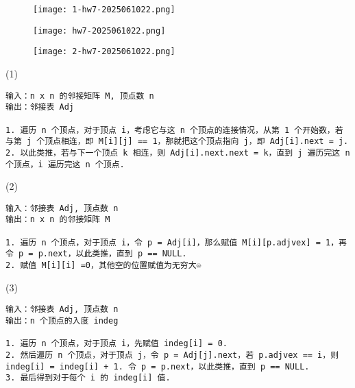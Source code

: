 \begin{exercise}
\begin{figure}[H]
\centering
\texttt{[image: 1-hw7-2025061022.png]}
\label{}
\end{figure}
\end{exercise}
\begin{figure}[H]
\centering
\texttt{[image: hw7-2025061022.png]}
\label{}
\end{figure}

\begin{exercise}
\begin{figure}[H]
\centering
\texttt{[image: 2-hw7-2025061022.png]}
\label{}
\end{figure}
\end{exercise}
(1)

\begin{lstlisting}
输入：n x n 的邻接矩阵 M, 顶点数 n
输出：邻接表 Adj

1. 遍历 n 个顶点，对于顶点 i，考虑它与这 n 个顶点的连接情况，从第 1 个开始数，若与第 j 个顶点相连，即 M[i][j] == 1，那就把这个顶点指向 j，即 Adj[i].next = j.
2. 以此类推，若与下一个顶点 k 相连，则 Adj[i].next.next = k，直到 j 遍历完这 n 个顶点，i 遍历完这 n 个顶点.

\end{lstlisting}
(2)

\begin{lstlisting}
输入：邻接表 Adj, 顶点数 n
输出：n x n 的邻接矩阵 M

1. 遍历 n 个顶点，对于顶点 i，令 p = Adj[i]，那么赋值 M[i][p.adjvex] = 1，再令 p = p.next，以此类推，直到 p == NULL.
2. 赋值 M[i][i] =0，其他空的位置赋值为无穷大♾️
\end{lstlisting}
(3)

\begin{lstlisting}
输入：邻接表 Adj, 顶点数 n
输出：n 个顶点的入度 indeg

1. 遍历 n 个顶点，对于顶点 i，先赋值 indeg[i] = 0.
2. 然后遍历 n 个顶点，对于顶点 j，令 p = Adj[j].next，若 p.adjvex == i，则 indeg[i] = indeg[i] + 1. 令 p = p.next，以此类推，直到 p == NULL.
3. 最后得到对于每个 i 的 indeg[i] 值.

\end{lstlisting}